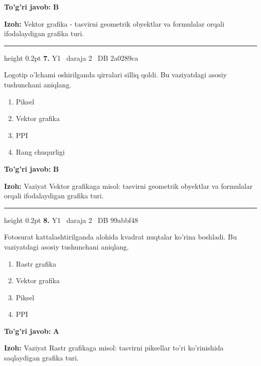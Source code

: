 \documentclass[10pt,a4paper,oneside]{article}
\begin{document}
\begin{tcolorbox}[enhanced,breakable,colback=teal!4,colframe=teal!45!black,boxrule=0.45pt,arc=1.2mm,left=2.8mm,right=2.8mm,top=2mm,bottom=2mm,before skip=2mm,after skip=2mm]
\textbf{\color{teal}To'g'ri javob:} \textbf{B}
\par\smallskip
\textbf{Izoh:} Vektor grafika - tasvirni geometrik obyektlar va formulalar orqali ifodalaydigan grafika turi.
\end{tcolorbox}
\vspace{2mm}\hrule height 0.2pt \vspace{4mm}
\hypertarget{q7}{\textbf{\color{ink}7.}}  {\color{muted}\scriptsize Y1 \textbullet\ daraja 2 \textbullet\ DB 2a0289ca}
\par
Logotip o'lchami oshirilganda qirralari silliq qoldi. Bu vaziyatdagi asosiy tushunchani aniqlang.
\begin{enumerate}[label=\Alph*),leftmargin=9mm]
\item Piksel
\item Vektor grafika
\item PPI
\item Rang chuqurligi
\end{enumerate}
\begin{tcolorbox}[enhanced,breakable,colback=teal!4,colframe=teal!45!black,boxrule=0.45pt,arc=1.2mm,left=2.8mm,right=2.8mm,top=2mm,bottom=2mm,before skip=2mm,after skip=2mm]
\textbf{\color{teal}To'g'ri javob:} \textbf{B}
\par\smallskip
\textbf{Izoh:} Vaziyat Vektor grafikaga misol: tasvirni geometrik obyektlar va formulalar orqali ifodalaydigan grafika turi.
\end{tcolorbox}
\vspace{2mm}\hrule height 0.2pt \vspace{4mm}
\hypertarget{q8}{\textbf{\color{ink}8.}}  {\color{muted}\scriptsize Y1 \textbullet\ daraja 2 \textbullet\ DB 99abbf48}
\par
Fotosurat kattalashtirilganda alohida kvadrat nuqtalar ko'rina boshladi. Bu vaziyatdagi asosiy tushunchani aniqlang.
\begin{enumerate}[label=\Alph*),leftmargin=9mm]
\item Rastr grafika
\item Vektor grafika
\item Piksel
\item PPI
\end{enumerate}
\begin{tcolorbox}[enhanced,breakable,colback=teal!4,colframe=teal!45!black,boxrule=0.45pt,arc=1.2mm,left=2.8mm,right=2.8mm,top=2mm,bottom=2mm,before skip=2mm,after skip=2mm]
\textbf{\color{teal}To'g'ri javob:} \textbf{A}
\par\smallskip
\textbf{Izoh:} Vaziyat Rastr grafikaga misol: tasvirni piksellar to'ri ko'rinishida saqlaydigan grafika turi.
\end{tcolorbox}
\end{document}
